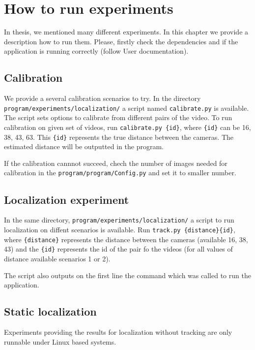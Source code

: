 \chapter{How to run experiments}

In thesis, we mentioned many different experiments. In this chapter we provide
a description how to run them. Please, firstly check the dependencies and if
the application is running correctly (follow User documentation).

\section{Calibration}

We provide a several calibration scenarios to try. In the directory
\verb+program/experiments/localization/+ a script named \verb+calibrate.py+ is
available. The script sets options to calibrate from different pairs of the
video. To run calibration on given set of videos, run \verb+calibrate.py {id}+,
where \verb+{id}+ can be 16, 38, 43, 63. This \verb+{id}+ represents the true
distance between the cameras. The estimated distance will be outputted in the
program.

If the calibration cannnot succeed, chech the number of images needed for
calibration in the \verb+program/program/Config.py+ and set it to smaller
number.

\section{Localization experiment}

In the same directory, \verb+program/experiments/localization/+ a script to run
localization on diffent scenarios is available. Run \verb+track.py {distance}{id}+, 
where \verb+{distance}+ represents the distance between the cameras
(available 16, 38, 43) and the \verb+{id}+ represents the id of the pair fo the
videos (for all values of distance available scenarios 1 or 2).

The script also outputs on the first line the command which was called to run
the application.

\section{Static localization}

Experiments providing the results for localization without tracking are only
runnable under Linux based systems.

